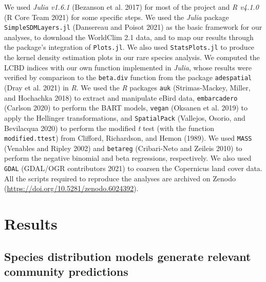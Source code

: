 \documentclass[11pt]{article}
\begin{document}
We used \emph{Julia v1.6.1} (Bezanson et al. 2017) for most of the
project and \emph{R v4.1.0} (R Core Team 2021) for some specific steps.
We used the \emph{Julia} package \texttt{SimpleSDMLayers.jl} (Dansereau
and Poisot 2021) as the basic framework for our analyses, to download
the WorldClim 2.1 data, and to map our results through the package's
integration of \texttt{Plots.jl}. We also used \texttt{StatsPlots.jl} to
produce the kernel density estimation plots in our rare species
analysis. We computed the LCBD indices with our own function implemented
in \emph{Julia}, whose results were verified by comparison to the
\texttt{beta.div} function from the package \texttt{adespatial} (Dray et
al. 2021) in \emph{R}. We used the \emph{R} packages \texttt{auk}
(Strimas-Mackey, Miller, and Hochachka 2018) to extract and manipulate
eBird data, \texttt{embarcadero} (Carlson 2020) to perform the BART
models, \texttt{vegan} (Oksanen et al. 2019) to apply the Hellinger
transformations, and \texttt{SpatialPack} (Vallejos, Osorio, and
Bevilacqua 2020) to perform the modified \emph{t} test (with the
function \texttt{modified.ttest}) from Clifford, Richardson, and Hemon
(1989). We used \texttt{MASS} (Venables and Ripley 2002) and
\texttt{betareg} (Cribari-Neto and Zeileis 2010) to perform the negative
binomial and beta regressions, respectively. We also used \texttt{GDAL}
(GDAL/OGR contributors 2021) to coarsen the Copernicus land cover data.
All the scripts required to reproduce the analyses are archived on
Zenodo (\url{https://doi.org/10.5281/zenodo.6024392}).

\hypertarget{results}{%
\section{Results}\label{results}}

\hypertarget{species-distribution-models-generate-relevant-community-predictions}{%
\subsection{Species distribution models generate relevant community
predictions}\label{species-distribution-models-generate-relevant-community-predictions}}
\end{document}
